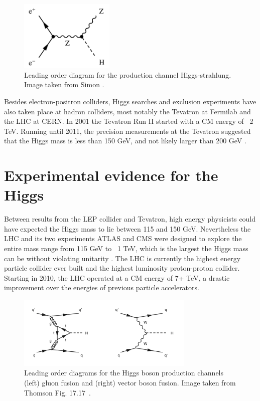 \begin{figure}
  \centering
  \includegraphics[width=0.40\textwidth,height=0.40\textheight,keepaspectratio]
                {pictures/higgsstrahlung.png}
  \caption{Leading order diagram for the production channel Higgs-strahlung. 
           Image taken from Simon \cite{simon_prospects_2013}.}
  \label{fig:higgsstrahlung}
\end{figure}

Besides electron-positron colliders, Higgs searches and exclusion experiments
have also taken place at hadron colliders, most notably the Tevatron at
Fermilab and the LHC at CERN. In 2001 the Tevatron Run II started with a CM 
energy of ~2 TeV. Running until 2011, the precision measurements at the
Tevatron suggested that the Higgs mass is less than 150 GeV, and not likely
larger than 200 GeV \cite{thomson_modern_2013}.

\section{Experimental evidence for the Higgs}
Between results from the LEP collider and Tevatron, high energy physicists
could have expected the Higgs mass to lie between 115 and 150 GeV. Nevertheless
the LHC and its two experiments ATLAS and CMS were designed to explore the
entire mass range from 115 GeV to ~1 TeV, which is the largest the Higgs mass
can be without violating unitarity \cite{dittmaier_higgs_2013}. The LHC is currently
the highest energy particle collider ever built and the highest luminosity 
proton-proton collider. Starting in 2010, the LHC operated at a CM energy of 7+
TeV, a drastic improvement over the energies of previous particle accelerators.
\begin{figure}
  \centering
  \includegraphics[width=0.75\textwidth,height=0.75\textheight,keepaspectratio]
                {pictures/higgs_prod_hadrons.png}
  \caption{Leading order diagrams for the Higgs boson production channels
           (left) gluon fusion and (right) vector boson fusion. Image taken 
           from Thomson Fig. 17.17~\cite{thomson_modern_2013}.}
  \label{fig:higgsfusion} 
\end{figure}

